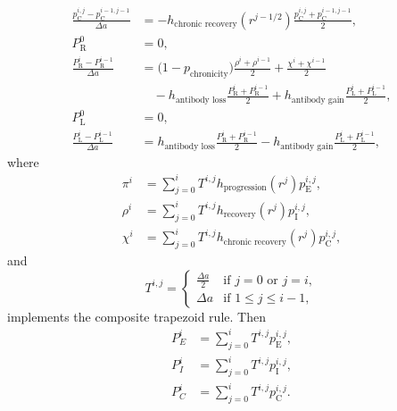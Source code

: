 \documentclass[12pt]{article}
\begin{document}
\begin{equation}
\begin{split}
    \frac{p_{\mathrm{C}}^{i, j} - p_{\mathrm{C}}^{i - 1, j - 1}}{\Delta a}
    &= - h_{\text{chronic recovery}}(r^{j - 1 / 2})
    \frac{p_{\mathrm{C}}^{i, j} + p_{\mathrm{C}}^{i - 1, j - 1}}{2},
    \\
    P_{\mathrm{R}}^0 &= 0,
    \\
    \frac{P_{\mathrm{R}}^i - P_{\mathrm{R}}^{i - 1}}{\Delta a}
    &= \big(1 - p_{\text{chronicity}}\big) \frac{\rho^i + \rho^{i - 1}}{2}
    + \frac{\chi^i + \chi^{i - 1}}{2}
    \\ & \quad {}
    - h_{\text{antibody loss}}
    \frac{P_{\mathrm{R}}^i + P_{\mathrm{R}}^{i - 1}}{2}
    + h_{\text{antibody gain}}
    \frac{P_{\mathrm{L}}^i + P_{\mathrm{L}}^{i - 1}}{2},
    \\
    P_{\mathrm{L}}^0 &= 0,
    \\
    \frac{P_{\mathrm{L}}^i - P_{\mathrm{L}}^{i - 1}}{\Delta a}
    &= h_{\text{antibody loss}}
    \frac{P_{\mathrm{R}}^i + P_{\mathrm{R}}^{i - 1}}{2}
    - h_{\text{antibody gain}}
    \frac{P_{\mathrm{L}}^i + P_{\mathrm{L}}^{i - 1}}{2},
  \end{split}
\end{equation}
where
\begin{equation}
  \begin{split}
    \pi^i &=
    \sum_{j = 0}^i T^{i, j} h_{\text{progression}}(r^j) p_{\mathrm{E}}^{i, j},
    \\
    \rho^i &=
    \sum_{j = 0}^i T^{i, j} h_{\text{recovery}}(r^j) p_{\mathrm{I}}^{i, j},
    \\
    \chi^i &=
    \sum_{j = 0}^i T^{i, j} h_{\text{chronic recovery}}(r^j) p_{\mathrm{C}}^{i, j},
  \end{split}
\end{equation}
and
\begin{equation}
  T^{i, j} =
  \begin{cases}
    \frac{\Delta a}{2} & \text{if $j = 0$ or $j = i$}, \\
    \Delta a & \text{if $1 \leq j \leq i - 1$},
  \end{cases}
\end{equation}
implements the composite trapezoid rule.
Then
\begin{equation}
  \begin{split}
    P_E^i &= \sum_{j = 0}^i T^{i, j} p_{\mathrm{E}}^{i, j},
    \\
    P_I^i &= \sum_{j = 0}^i T^{i, j} p_{\mathrm{I}}^{i, j},
    \\
    P_C^i &= \sum_{j = 0}^i T^{i, j} p_{\mathrm{C}}^{i, j}.
  \end{split}
\end{equation}
\end{document}
